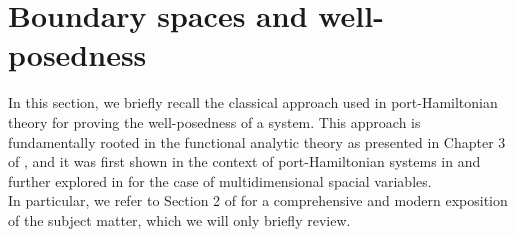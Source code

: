 \documentclass{ifacconf}
\begin{document}
\section{Boundary spaces and well-posedness}
In this section, we briefly recall the classical approach used in port-Hamiltonian theory for proving the well-posedness of a system. This approach is fundamentally rooted in the functional analytic theory as presented in Chapter 3 of \cite{Gor:91}, and it was first shown in the context of port-Hamiltonian systems in \cite{YZB:06} and further explored in \cite{KZ:15} for the case of multidimensional spacial variables.\\
In particular, we refer to Section 2 of \cite{KZ:15} for a comprehensive and modern exposition of the subject matter, which we will only briefly review.\\
\end{document}
